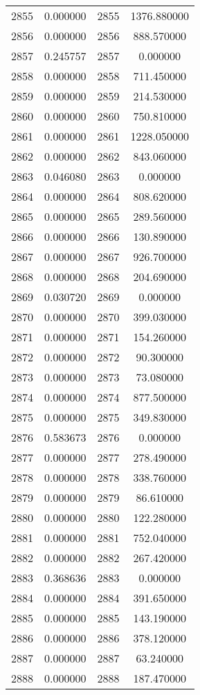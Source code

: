 \documentclass[12pt]{article}
\begin{document}
\begin{longtable}{@{}cccc@{}}
2855 & 0.000000 & 2855 & 1376.880000 \\
2856 & 0.000000 & 2856 & 888.570000 \\
2857 & 0.245757 & 2857 & 0.000000 \\
2858 & 0.000000 & 2858 & 711.450000 \\
2859 & 0.000000 & 2859 & 214.530000 \\
2860 & 0.000000 & 2860 & 750.810000 \\
2861 & 0.000000 & 2861 & 1228.050000 \\
2862 & 0.000000 & 2862 & 843.060000 \\
2863 & 0.046080 & 2863 & 0.000000 \\
2864 & 0.000000 & 2864 & 808.620000 \\
2865 & 0.000000 & 2865 & 289.560000 \\
2866 & 0.000000 & 2866 & 130.890000 \\
2867 & 0.000000 & 2867 & 926.700000 \\
2868 & 0.000000 & 2868 & 204.690000 \\
2869 & 0.030720 & 2869 & 0.000000 \\
2870 & 0.000000 & 2870 & 399.030000 \\
2871 & 0.000000 & 2871 & 154.260000 \\
2872 & 0.000000 & 2872 & 90.300000 \\
2873 & 0.000000 & 2873 & 73.080000 \\
2874 & 0.000000 & 2874 & 877.500000 \\
2875 & 0.000000 & 2875 & 349.830000 \\
2876 & 0.583673 & 2876 & 0.000000 \\
2877 & 0.000000 & 2877 & 278.490000 \\
2878 & 0.000000 & 2878 & 338.760000 \\
2879 & 0.000000 & 2879 & 86.610000 \\
2880 & 0.000000 & 2880 & 122.280000 \\
2881 & 0.000000 & 2881 & 752.040000 \\
2882 & 0.000000 & 2882 & 267.420000 \\
2883 & 0.368636 & 2883 & 0.000000 \\
2884 & 0.000000 & 2884 & 391.650000 \\
2885 & 0.000000 & 2885 & 143.190000 \\
2886 & 0.000000 & 2886 & 378.120000 \\
2887 & 0.000000 & 2887 & 63.240000 \\
2888 & 0.000000 & 2888 & 187.470000 \\

\end{longtable}
\end{document}

